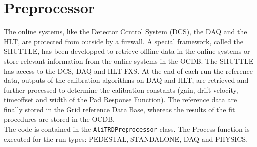 \documentclass{alicetdr}
\begin{document}
\section{Preprocessor}
%
The online systems, like the Detector Control System (DCS), the DAQ
and the HLT, are protected from outside by a firewall. A special
framework, called the SHUTTLE, has been developped to retrieve offline
data in the online systems or store relevant information from the
online systems in the OCDB. The SHUTTLE has access to the DCS, DAQ
and HLT FXS. At the end of each run the reference data, outputs of
the calibration algorithms on DAQ and HLT, are retrieved and further
processed to determine the calibration constants (gain, drift velocity,
timeoffset and width of the Pad Response Function). The reference
data are finally stored in the Grid reference Data Base, whereas the
results of the fit procedures are stored in the OCDB.\\
The code is contained in the {\tt AliTRDPreprocessor} class. The
Process function is executed for the run types: PEDESTAL, STANDALONE,
DAQ and PHYSICS.
\end{document}
